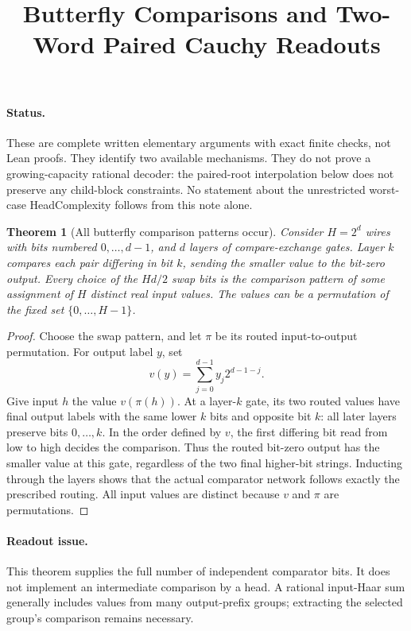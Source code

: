 \documentclass[11pt]{article}
\title{Butterfly Comparisons and Two-Word Paired Cauchy Readouts}
\author{}\date{}
\newtheorem{theorem}{Theorem}
\begin{document}
\maketitle

\paragraph{Status.}
These are complete written elementary arguments with exact finite checks,
not Lean proofs. They identify two available mechanisms. They do not
prove a growing-capacity rational decoder: the paired-root interpolation
below does not preserve any child-block constraints. No statement about
the unrestricted worst-case HeadComplexity follows from this note alone.

\begin{theorem}[All butterfly comparison patterns occur]
Consider $H=2^d$ wires with bits numbered $0,\ldots,d-1$, and $d$
layers of compare-exchange gates. Layer $k$ compares each pair differing
in bit $k$, sending the smaller value to the bit-zero output. Every
choice of the $Hd/2$ swap bits is the comparison pattern of some
assignment of $H$ distinct real input values. The values can be a
permutation of the fixed set $\{0,\ldots,H-1\}$.
\end{theorem}
\begin{proof}
Choose the swap pattern, and let $\pi$ be its routed input-to-output
permutation. For output label $y$, set
\[
 v(y)=\sum_{j=0}^{d-1} y_j2^{d-1-j}.
\]
Give input $h$ the value $v(\pi(h))$. At a layer-$k$ gate, its two
routed values have final output labels with the same lower $k$ bits
and opposite bit $k$: all later layers preserve bits $0,\ldots,k$.
In the order defined by $v$, the first differing bit read from low to
high decides the comparison. Thus the routed bit-zero output has the
smaller value at this gate, regardless of the two final higher-bit
strings. Inducting through the layers shows that the actual comparator
network follows exactly the prescribed routing. All input values are
distinct because $v$ and $\pi$ are permutations.
\end{proof}

\paragraph{Readout issue.}
This theorem supplies the full number of independent comparator bits.
It does not implement an intermediate comparison by a head. A rational
input-Haar sum generally includes values from many output-prefix groups;
extracting the selected group's comparison remains necessary.
\end{document}
